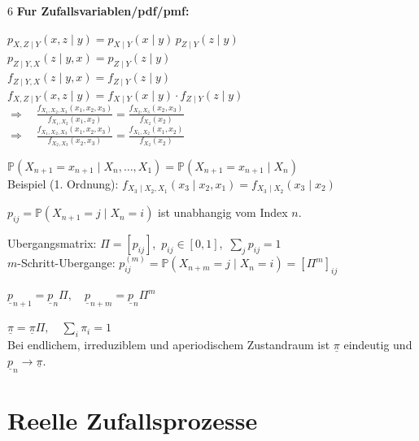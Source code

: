 \documentclass[8pt,a4paper,landscape]{extarticle}
\begin{document}
\begin{multicols*}{6}
{\color{orange} \textbf{Fur Zufallsvariablen/pdf/pmf:}}

$p_{X,Z\mid Y}(x,z\mid y)=p_{X\mid Y}(x\mid y)\,p_{Z\mid Y}(z\mid y)$ \\
$p_{Z\mid Y,X}(z\mid y,x)=p_{Z\mid Y}(z\mid y)$ \\
$f_{Z\mid Y,X}(z\mid y,x)=f_{Z\mid Y}(z\mid y)$ \\
$f_{X,Z\mid Y}(x,z\mid y)
    = f_{X\mid Y}(x\mid y)\cdot f_{Z\mid Y}(z\mid y)$ \\ [3pt]
$\Rightarrow\quad\frac{f_{X_1,X_2,X_3}(x_1,x_2,x_3)}{f_{X_1,X_2}(x_1,x_2)}
    = \frac{f_{X_2,X_3}(x_2,x_3)}{f_{X_2}(x_2)}$ \\ [-3pt] 

$\Rightarrow\quad
\frac{f_{X_1,X_2,X_3}(x_1,x_2,x_3)}{f_{X_2,X_3}(x_2,x_3)}
    = \frac{f_{X_1,X_2}(x_1,x_2)}{f_{X_2}(x_2)}$ \\ [-5pt]



$\mathbb{P}(X_{n+1}=x_{n+1}\mid X_n,\dots,X_1)=\mathbb{P}(X_{n+1}=x_{n+1}\mid X_n)$ \\
Beispiel (1. Ordnung): $f_{X_3\mid X_2,X_1}(x_3\mid x_2,x_1)=f_{X_3\mid X_2}(x_3\mid x_2)$


$p_{ij}=\mathbb{P}(X_{n+1}=j\mid X_n=i)$ ist unabhangig vom Index $n$.


Ubergangsmatrix: $\Pi=[p_{ij}]$,\ $p_{ij}\in[0,1]$,\ $\sum_j p_{ij}=1$ \\
$m$-Schritt-Ubergange: $p_{ij}^{(m)}=\mathbb{P}(X_{n+m}=j\mid X_n=i)=[\Pi^m]_{ij}$


$\underline{p}_{n+1}=\underline{p}_n\Pi,\quad \underline{p}_{n+m}=\underline{p}_n\Pi^m$


$\underline{\pi}=\underline{\pi}\Pi,\quad \sum_i \pi_i=1$ \\
Bei endlichem, irreduziblem und aperiodischem Zustandraum ist $\underline{\pi}$ eindeutig und
$\underline{p}_n\to\underline{\pi}$.


\section{Reelle Zufallsprozesse}


\end{multicols*}
\end{document}
